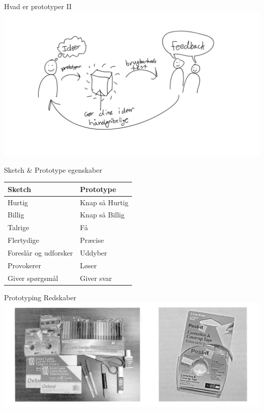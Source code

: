 \documentclass[10pt]{beamer}
\begin{document}
\begin{frame}{Hvad er prototyper II}
	\centering
	\includegraphics[scale=0.18]{img/prototypingloop.pdf}
\end{frame}

\begin{frame}{Sketch \& Prototype egenskaber}
\begin{center}
  \begin{tabular}{| l | l |}
    \hline
	\textbf{Sketch} & \textbf{Prototype} \\ \hline
    Hurtig & Knap så Hurtig\\ \hline
    Billig & Knap så Billig\\ \hline
    Talrige & Få \\ \hline
    Flertydige & Præcise \\ \hline
    Foreslår og udforsker & Uddyber \\ \hline
    Provokerer & Løser \\ \hline
    Giver spørgsmål & Giver svar \\ \hline
  \end{tabular}
\end{center}
\end{frame}


\begin{frame}{Prototyping Redskaber}
\centering
	\includegraphics[width=\linewidth]{img/tapeandtools.png}
\end{frame}
\end{document}
